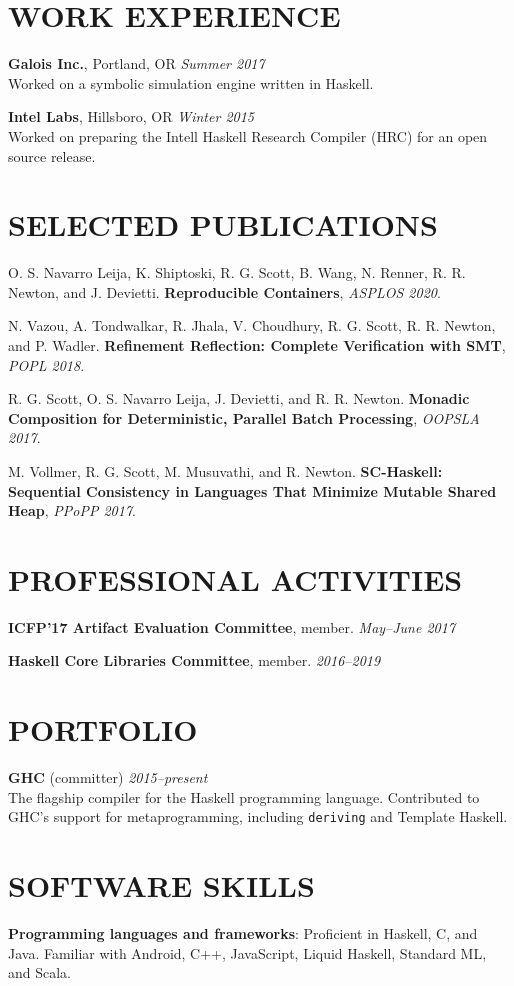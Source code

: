 \documentclass{res}
\begin{document}
\begin{resume}

\section{WORK EXPERIENCE}
    \textbf{Galois Inc.}, Portland, OR \hfill \textit{Summer 2017} \\
    Worked on a symbolic simulation engine written in Haskell.

    \textbf{Intel Labs}, Hillsboro, OR \hfill \textit{Winter 2015} \\
    Worked on preparing the Intell Haskell Research Compiler (HRC) for an open source release.

\section{SELECTED PUBLICATIONS}
        O. S. Navarro Leija, K. Shiptoski, R. G. Scott, B. Wang, N. Renner, R. R. Newton, and J. Devietti. \textbf{Reproducible Containers}, \textit{ASPLOS 2020}.

        N. Vazou, A. Tondwalkar, R. Jhala, V. Choudhury, R. G. Scott, R. R. Newton, and P. Wadler. \textbf{Refinement Reflection: Complete Verification with SMT}, \textit{POPL 2018}.

        R. G. Scott, O. S. Navarro Leija, J. Devietti, and R. R. Newton. \textbf{Monadic Composition for Deterministic, Parallel Batch Processing}, \textit{OOPSLA 2017}.

        M. Vollmer, R. G. Scott, M. Musuvathi, and R. Newton. \textbf{SC-Haskell: Sequential Consistency in Languages That Minimize Mutable Shared Heap}, \textit{PPoPP 2017}.

\section{PROFESSIONAL ACTIVITIES}
    \textbf{ICFP'17 Artifact Evaluation Committee}, member. \hfill \textit{May--June 2017}

    \textbf{Haskell Core Libraries Committee}, member. \hfill \textit{2016--2019}

\section{PORTFOLIO}
    \textbf{GHC} (committer) \hfill \textit{2015--present} \\
    The flagship compiler for the Haskell programming language. Contributed to GHC's support for metaprogramming, including \texttt{deriving} and Template Haskell. \\

\section{SOFTWARE SKILLS}
    \textbf{Programming languages and frameworks}: Proficient in Haskell, C, and Java. Familiar with Android, C++, JavaScript, Liquid Haskell, Standard ML, and Scala.
\end{resume}
\end{document}
